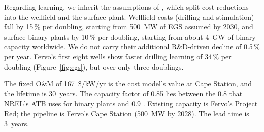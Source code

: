 Regarding learning, we inherit the assumptions of \citet{ricks2025}, which split cost reductions into the wellfield and the surface plant.
Wellfield costs (drilling and stimulation) fall by 15\,\% per doubling, starting from 500~MW of EGS assumed by 2030, and surface binary plants by 10\,\% per doubling, starting from about 4~GW of binary capacity worldwide.
We do not carry their additional R\&D-driven decline of 0.5\,\% per year.
Fervo's first eight wells show faster drilling learning of 34\,\% per doubling (Figure~\ref{fig:egs}), but over only three doublings.

The fixed O\&M of 167~\$/kW/yr is the cost model's value at Cape Station, and the lifetime is 30~years.
The capacity factor of 0.85 lies between the 0.8 that NREL's ATB uses for binary plants and 0.9 \citep{atb2024}.
Existing capacity is Fervo's Project Red; the pipeline is Fervo's Cape Station (500~MW by 2028).
The lead time is 3~years.

